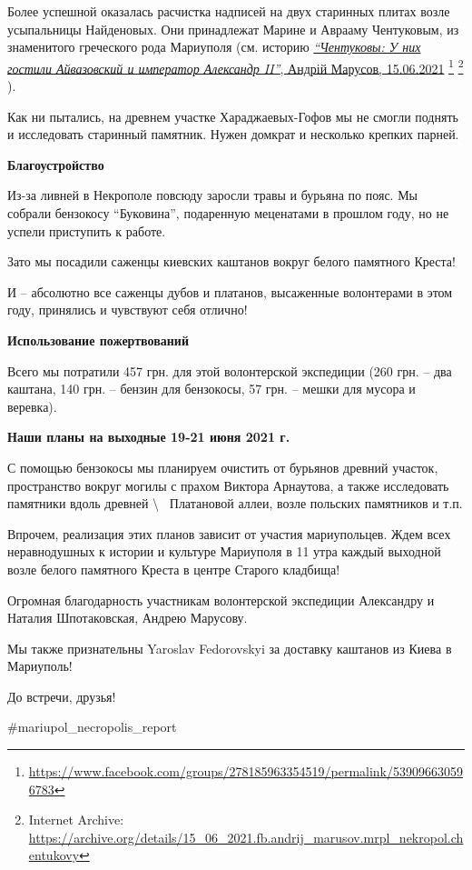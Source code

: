 Более успешной оказалась расчистка надписей на двух старинных плитах возле
усыпальницы Найденовых. Они принадлежат Марине и Аврааму Чентуковым, из
знаменитого греческого рода Мариуполя (см. историю \href{https://archive.org/details/15_06_2021.fb.andrij_marusov.mrpl_nekropol.chentukovy}{%
\emph{\enquote{Чентуковы: У них гостили
Айвазовский и император Александр II}}, Андрій Марусов, 15.06.2021}
\footnote{\url{https://www.facebook.com/groups/278185963354519/permalink/539096630596783}}
\footnote{Internet Archive: \url{https://archive.org/details/15_06_2021.fb.andrij_marusov.mrpl_nekropol.chentukovy}}
).

Как ни пытались, на древнем участке Хараджаевых-Гофов мы не смогли поднять и
исследовать старинный памятник. Нужен домкрат и несколько крепких парней.

\textbf{Благоустройство}

Из-за ливней в Некрополе повсюду заросли травы и бурьяна по пояс. Мы собрали
бензокосу \enquote{Буковина}, подаренную меценатами в прошлом году, но не
успели приступить к работе.

Зато мы посадили саженцы киевских каштанов вокруг белого памятного Креста!

И – абсолютно все саженцы дубов и платанов, высаженные волонтерами в этом году,
принялись и чувствуют себя отлично! 🙂

\textbf{Использование пожертвований}

Всего мы потратили 457 грн. для этой волонтерской экспедиции (260 грн. – два
каштана, 140 грн. – бензин для бензокосы, 57 грн. – мешки для мусора и
веревка).

\textbf{Наши планы на выходные 19-21 июня 2021 г.}

С помощью бензокосы мы планируем очистить от бурьянов древний участок,
пространство вокруг могилы с прахом Виктора Арнаутова, а также исследовать
памятники вдоль древней \textbackslash~ Платановой аллеи, возле польских памятников и т.п.

Впрочем, реализация этих планов зависит от участия мариупольцев. Ждем всех
неравнодушных к истории и культуре Мариуполя в 11 утра каждый выходной возле
белого памятного Креста в центре Старого кладбища!

Огромная благодарность участникам волонтерской экспедиции Александру и Наталия Шпотаковская, Андрею Марусову.

Мы также признательны Yaroslav Fedorovskyi за доставку каштанов из Киева в Мариуполь!

До встречи, друзья!

\#mariupol\_necropolis\_report
